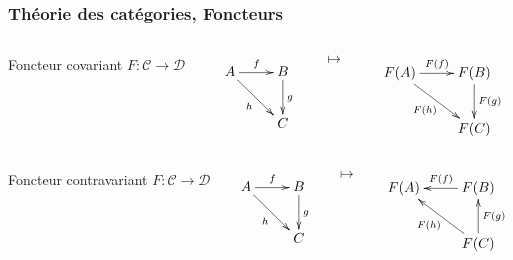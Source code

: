 \documentclass[10pt]{beamer}
\newcommand{\cat}[1]{\mathscr{#1}}
\newcommand{\C}{\cat{C}}
\newcommand{\D}{\cat{D}}
\newcommand{\ra}{\rightarrow}
\begin{document}
\begin{frame}
  \frametitle{Théorie des catégories, Foncteurs}
  
  \begin{columns}
    \begin{column}{0.3\textwidth}
      Foncteur covariant $F:\C\ra\D$
    \end{column}

    \begin{column}{0.25\textwidth}
      \begin{equation*}
        \xymatrix{
          A \ar[r]^f \ar[dr]_{h} & B \ar[d]^g \\
          & C
        }
      \end{equation*}
    \end{column}
    \begin{column}{0.05\textwidth}
      $\mapsto$
    \end{column}
    \begin{column}{0.35\textwidth}
      \begin{equation*}
        \xymatrix{
          F(A) \ar[r]^{F(f)} \ar[dr]_{F(h)} & F(B) \ar[d]^{F(g)} \\
          & F(C)
        }    
      \end{equation*}
    \end{column}
  \end{columns}

  \begin{columns}
    \begin{column}{0.3\textwidth}
      Foncteur contravariant $F:\C\ra\D$
    \end{column}

    \begin{column}{0.25\textwidth}
      \begin{equation*}
        \xymatrix{
          A \ar[r]^f \ar[dr]_{h} & B \ar[d]^g \\
          & C
        }
      \end{equation*}
    \end{column}
    \begin{column}{0.05\textwidth}
      $\mapsto$
    \end{column}
    \begin{column}{0.35\textwidth}
      \begin{equation*}
        \xymatrix{
          F(A) & F(B) \ar[l]_{F(f)} \\
          & F(C) \ar[u]_{F(g)} \ar[ul]^{F(h)}
        }    
      \end{equation*}
    \end{column}
  \end{columns}


\end{frame}
\end{document}
